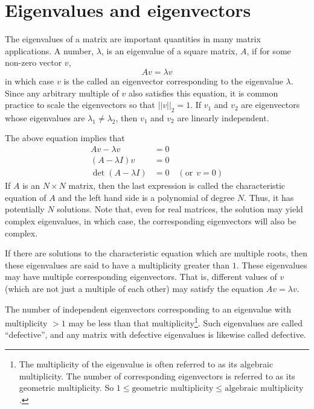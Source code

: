 
\section{Eigenvalues and eigenvectors}
\label{Eigenvalues}

The eigenvalues of a matrix are important quantities in many matrix applications.
A number, $\lambda$, is an eigenvalue of a square matrix, $A$, if for some
non-zero vector $v$,
\begin{equation*}
A v = \lambda v
\end{equation*}
in which case $v$ is the called an eigenvector corresponding to the eigenvalue $\lambda$.
Since any arbitrary multiple of $v$ also satisfies this equation, it is common practice
to scale the eigenvectors so that $||v||_2 = 1$.
If $v_1$ and $v_2$ are eigenvectors whose eigenvalues are 
$\lambda_1 \neq \lambda_2$, then $v_1$ and $v_2$ are linearly independent.

The above equation implies that 
\begin{align*}
A v - \lambda v &= 0 \\
(A - \lambda I) v &= 0 \\
\det(A-\lambda I) &= 0 \quad (\text{or} ~~ v = 0)
\end{align*}
If $A$ is an $N \times N$ matrix, then the last expression is called the characteristic
equation of $A$ and the left hand side is a polynomial of degree $N$.
Thus, it has potentially $N$ solutions.  
Note that, even for real matrices, the solution may yield complex eigenvalues, in which
case, the corresponding eigenvectors will also be complex.

If there are solutions to the characteristic equation which are multiple roots, then these
eigenvalues are said to have a multiplicity greater than $1$.  These eigenvalues 
may have multiple corresponding eigenvectors.  That is, different values of $v$ 
(which are not just a multiple of each other) may satisfy the equation $A v = \lambda v$.

The number of independent eigenvectors
corresponding to an eigenvalue with multiplicity $> 1$ may be less than that multiplicity\footnote{
The multiplicity of the eigenvalue is often referred to as its algebraic multiplicity.
The number of corresponding eigenvectors is referred to as its geometric multiplicity.
So $1 \leq \text{geometric multiplicity} \leq \text{algebraic multiplicity}$.}.  Such eigenvalues
are called ``defective'', and any matrix with defective eigenvalues is likewise
called defective.

